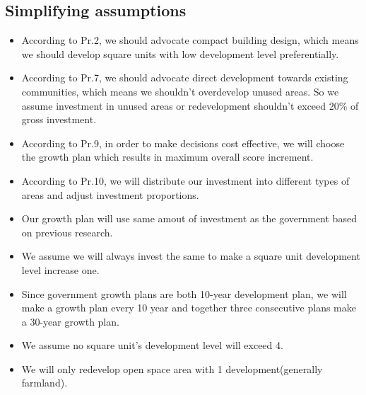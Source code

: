 \subsection{Simplifying assumptions}
\begin{itemize}
  \item According to Pr.2, we should advocate compact building design, which means we should develop square units with low development level preferentially.
  \item According to Pr.7, we should advocate direct development towards existing communities, which means we shouldn't overdevelop unused areas. So we assume investment in unused areas or redevelopment shouldn't exceed 20\% of gross investment.
  \item According to Pr.9, in order to make decisions cost effective, we will choose the growth plan which results in maximum overall score increment.
  \item According to Pr.10, we will distribute our investment into different types of areas and adjust investment proportions.
  \item Our growth plan will use same amout of investment as the government based on previous research.
  \item We assume we will always invest the same to make a square unit development level increase one.
  \item Since government growth plans are both 10-year development plan, we will make a growth plan every 10 year and together three consecutive plans make a 30-year growth plan.
  \item We assume no square unit's development level will exceed 4.
  \item We will only redevelop open space area with 1 development(generally farmland).
\end{itemize}

